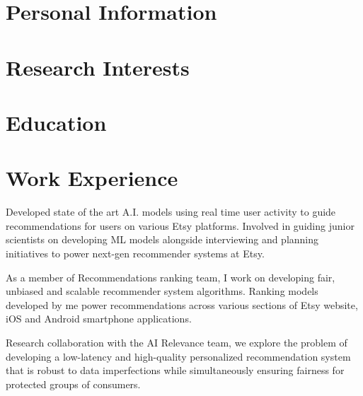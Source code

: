 \documentclass[10pt]{moderncv}
\begin{document}
\maketitle

\section{Personal Information}

\section{Research Interests}

\section{Education}

\section{Work Experience}
{
    Developed state of the art A.I. models using real time user activity to guide recommendations for users on various 
        Etsy platforms. 
    Involved in guiding junior scientists on developing ML models alongside interviewing and planning initiatives to 
        power next-gen recommender systems at Etsy.
}


{
    As a member of Recommendations ranking team, I work on developing fair, unbiased and scalable 
        recommender system algorithms.
    Ranking models developed by me power recommendations across various sections of Etsy website, iOS and Android 
        smartphone applications.
}

{
    Research collaboration with the AI Relevance team, we explore the problem of developing a low-latency and
        high-quality personalized recommendation system that is robust to data imperfections while simultaneously 
        ensuring fairness for protected groups of consumers.
}
\end{document}
